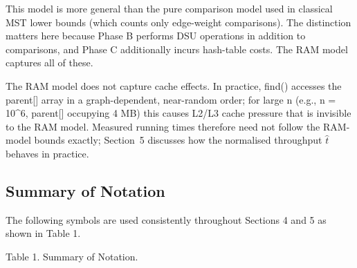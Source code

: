 \documentclass[11pt]{article}
\theoremstyle{plain}
\theoremstyle{remark}
\begin{document}
This model is more general than the pure comparison model used in
classical MST lower bounds (which counts only edge-weight comparisons).
The distinction matters here because Phase B performs DSU operations in
addition to comparisons, and Phase C additionally incurs hash-table
costs. The RAM model captures all of
these.

The RAM model does not capture cache effects. In practice, find()
accesses the parent{[}{]} array in a graph-dependent, near-random order;
for large n (e.g., n = 10\^{}6, parent{[}{]} occupying 4 MB) this causes
L2/L3 cache pressure that is invisible to the RAM model. Measured
running times therefore need not follow the RAM-model bounds exactly;
Section~5 discusses how the normalised throughput \(\widehat{t}\)
behaves in practice.

\subsection{Summary of Notation}

The following symbols are used consistently throughout Sections 4 and 5
as shown in Table 1.

Table 1. Summary of Notation.
\end{document}
